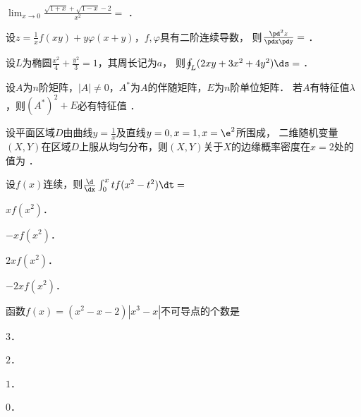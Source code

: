 \documentclass[plain,noanswer,medmath]{../../template/jnuexam}
\begin{document}




\begin{problem}
$\lim_{x \to 0} \frac{\sqrt{1 + x} + \sqrt{1 - x} - 2}{x^2} =$ \fillin{}．
\end{problem}


\begin{problem}
设$z = \frac{1}{x}f(xy) + y\varphi(x + y)$，$f,\varphi$具有二阶连续导数，
则$\frac{\pd^2 z}{\pdx\pdy}=$ \fillin{}．
\end{problem}


\begin{problem}
设$L$为椭圆$\frac{x^2}{4} + \frac{y^2}{3} = 1$，其周长记为$a$，
则$\oint_L (2xy + 3x^2 + 4y^2)\ds =$ \fillin{}．
\end{problem}


\begin{problem}
设$A$为$n$阶矩阵，$|A| \ne 0$，$A^*$为$A$的伴随矩阵，$E$为$n$阶单位矩阵．
若$A$有特征值$\lambda$，则$(A^*)^2 + E$必有特征值 \fillin{}．
\end{problem}


\begin{problem}
设平面区域$D$由曲线$y = \frac{1}{x}$及直线$y = 0,x = 1,x = \e^2$所围成，
二维随机变量$(X,Y)$在区域$D$上服从均匀分布，则$(X,Y)$关于$X$的边缘概率密度在$x=2$处的值为 \fillin{}．
\end{problem}




\begin{problem}
设$f(x)$连续，则$\frac{\d}{\dx}\int_0^x tf(x^2 - t^2) \dt =$\pickout{}
\begin{abcd}
\item $xf(x^2)$．
\item $- xf(x^2)$．
\item $2xf(x^2)$．
\item $- 2xf(x^2)$．
\end{abcd}
\end{problem}


\begin{problem}
函数$f(x) = (x^2 - x - 2)\left| x^3 - x \right|$不可导点的个数是\pickout{}
\begin{abcd}
\item $3$．
\item $2$．
\item $1$．
\item $0$．
\end{abcd}
\end{problem}
\end{document}
